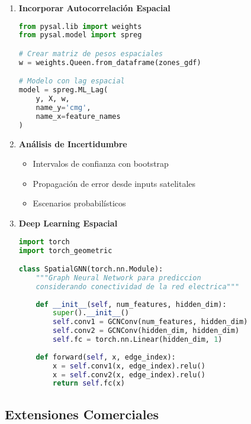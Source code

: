 \documentclass[12pt,a4paper]{article}
\begin{document}
\begin{enumerate}
    \item \textbf{Incorporar Autocorrelación Espacial}
    \begin{lstlisting}[language=Python]
from pysal.lib import weights
from pysal.model import spreg

# Crear matriz de pesos espaciales
w = weights.Queen.from_dataframe(zones_gdf)

# Modelo con lag espacial
model = spreg.ML_Lag(
    y, X, w,
    name_y='cmg',
    name_x=feature_names
)
    \end{lstlisting}
    
    \item \textbf{Análisis de Incertidumbre}
    \begin{itemize}
        \item Intervalos de confianza con bootstrap
        \item Propagación de error desde inputs satelitales
        \item Escenarios probabilísticos
    \end{itemize}
    
    \item \textbf{Deep Learning Espacial}
    \begin{lstlisting}[language=Python]
import torch
import torch_geometric

class SpatialGNN(torch.nn.Module):
    """Graph Neural Network para prediccion
    considerando conectividad de la red electrica"""
    
    def __init__(self, num_features, hidden_dim):
        super().__init__()
        self.conv1 = GCNConv(num_features, hidden_dim)
        self.conv2 = GCNConv(hidden_dim, hidden_dim)
        self.fc = torch.nn.Linear(hidden_dim, 1)
        
    def forward(self, x, edge_index):
        x = self.conv1(x, edge_index).relu()
        x = self.conv2(x, edge_index).relu()
        return self.fc(x)
    \end{lstlisting}
\end{enumerate}

\subsection{Extensiones Comerciales}
\end{document}
